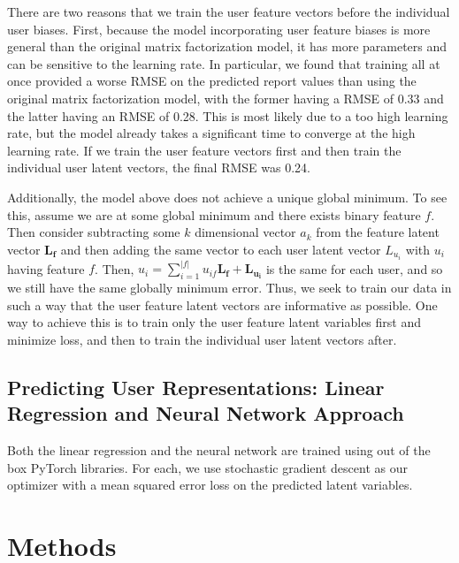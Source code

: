 \documentclass{article}
\begin{document}
There are two reasons that we train the user feature vectors before the individual user biases. First, because the model incorporating user feature biases is more general than the original matrix factorization model, it has more parameters and can be sensitive to the learning rate. In particular, we found that training all at once provided a worse RMSE on the predicted report values than using the original matrix factorization model, with the former having a RMSE of 0.33 and the latter having an RMSE of 0.28. This is most likely due to a too high learning rate, but the model already takes a significant time to converge at the high learning rate. If we train the user feature vectors first and then train the individual user latent vectors, the final RMSE was 0.24. 

Additionally, the model above does not achieve a unique global minimum. To see this, assume we are at some global minimum and there exists binary feature $f$. Then consider subtracting some $k$ dimensional vector $a_{k}$ from the feature latent vector $\mathbf{L_{f}}$ and then adding the same vector to each user latent vector $L_{u_{i}}$ with $u_{i}$ having feature $f$. Then, $u_{i} = \sum_{i=1}^{\vert f \vert} u_{if} \mathbf{L_{f}} + \mathbf{L_{u_{i}}}$ is the same for each user, and so we still have the same globally minimum error. Thus, we seek to train our data in such a way that the user feature latent vectors are informative as possible. One way to achieve this is to train only the user feature latent variables first and minimize loss, and then to train the individual user latent vectors after. 

\subsection{Predicting User Representations: Linear Regression and Neural Network Approach}
Both the linear regression and the neural network are trained using out of the box PyTorch libraries. For each, we use stochastic gradient descent as our optimizer with a mean squared error loss on the predicted latent variables. 

\section{Methods}

\end{document}

